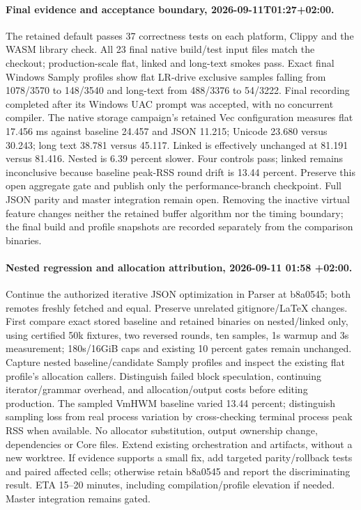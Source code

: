 \documentclass[11pt,a4paper]{article}
\begin{document}
\paragraph{Final evidence and acceptance boundary, 2026-09-11T01:27+02:00.}
The retained default passes 37 correctness tests on each platform, Clippy and the
WASM library check. All 23 final native build/test input files match the checkout;
production-scale flat, linked and long-text smokes pass. Exact final Windows
Samply profiles show flat LR-drive exclusive samples falling from 1078/3570 to
148/3540 and long-text from 488/3376 to 54/3222. Final recording completed after
its Windows UAC prompt was accepted, with no concurrent compiler.
The native storage campaign's retained Vec configuration measures flat 17.456 ms
against baseline 24.457 and JSON 11.215; Unicode 23.680 versus 30.243; long text
38.781 versus 45.117. Linked is effectively unchanged at 81.191 versus 81.416.
Nested is 6.39 percent slower. Four controls pass; linked remains inconclusive
because baseline peak-RSS round drift is 13.44 percent. Preserve this open aggregate
gate and publish only the performance-branch checkpoint. Full JSON parity and
master integration remain open. Removing the inactive virtual feature changes
neither the retained buffer algorithm nor the timing boundary; the final build
and profile snapshots are recorded separately from the comparison binaries.

\paragraph{Nested regression and allocation attribution, 2026-09-11 01:58 +02:00.}
Continue the authorized iterative JSON optimization in Parser at b8a0545; both
remotes freshly fetched and equal. Preserve unrelated gitignore/LaTeX changes.
First compare exact stored baseline and retained binaries on nested/linked only,
using certified 50k fixtures, two reversed rounds, ten samples, 1s warmup and
3s measurement; 180s/16GiB caps and existing 10 percent gates remain unchanged.
Capture nested baseline/candidate Samply profiles and inspect the existing flat
profile's allocation callers. Distinguish failed block speculation, continuing
iterator/grammar overhead, and allocation/output costs before editing production.
The sampled VmHWM baseline varied 13.44 percent; distinguish sampling loss from
real process variation by cross-checking terminal process peak RSS when available.
No allocator substitution, output ownership change, dependencies or Core files.
Extend existing orchestration and artifacts, without a new worktree. If evidence
supports a small fix, add targeted parity/rollback tests and paired affected cells;
otherwise retain b8a0545 and report the discriminating result. ETA 15--20 minutes,
including compilation/profile elevation if needed. Master integration remains gated.
\end{document}
